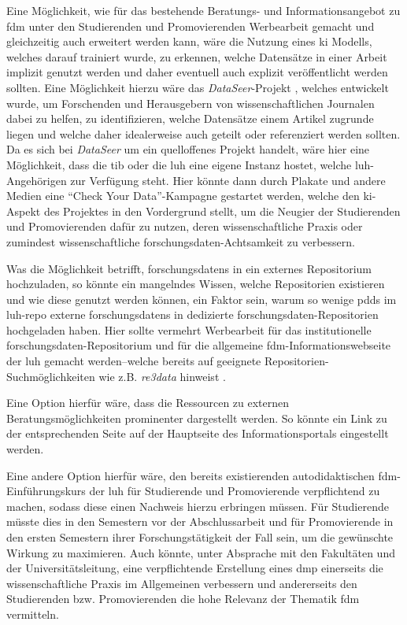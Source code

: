 Eine Möglichkeit, wie für das bestehende Beratungs- und Informationsangebot zu \gls{fdm} unter den Studierenden und Promovierenden Werbearbeit gemacht und gleichzeitig auch erweitert werden kann, wäre die Nutzung eines \gls{ki} Modells, welches darauf trainiert wurde, zu erkennen, welche Datensätze in einer Arbeit implizit genutzt werden und daher eventuell auch explizit veröffentlicht werden sollten.
Eine Möglichkeit hierzu wäre das \textit{DataSeer}-Projekt \autocite{dataseer}, welches entwickelt wurde, um Forschenden und Herausgebern von wissenschaftlichen Journalen dabei zu helfen, zu identifizieren, welche Datensätze einem Artikel zugrunde liegen und welche daher idealerweise auch geteilt oder referenziert werden sollten.
Da es sich bei \textit{DataSeer} um ein quelloffenes Projekt handelt, wäre hier eine Möglichkeit, dass die \gls{tib} oder die \gls{luh} eine eigene Instanz hostet, welche \gls{luh}-Angehörigen zur Verfügung steht.
Hier könnte dann durch Plakate und andere Medien eine \enquote{Check Your Data}-Kampagne gestartet werden, welche den \gls{ki}-Aspekt des Projektes in den Vordergrund stellt, um die Neugier der Studierenden und Promovierenden dafür zu nutzen, deren wissenschaftliche Praxis oder zumindest wissenschaftliche \gls{forschungsdaten}-Achtsamkeit zu verbessern.

Was die Möglichkeit betrifft, \glspl{forschungsdaten} in ein externes Repositorium hochzuladen, so könnte ein mangelndes Wissen, welche Repositorien existieren und wie diese genutzt werden können, ein Faktor sein, warum so wenige \glspl{pdd} im \gls{luh-repo} externe \glspl{forschungsdaten} in dedizierte \gls{forschungsdaten}-Repositorien hochgeladen haben.
Hier sollte vermehrt Werbearbeit für das institutionelle \gls{forschungsdaten}-Repositorium und für die allgemeine \gls{fdm}-Informationswebseite der \gls{luh} gemacht werden--welche bereits auf geeignete Repositorien-Suchmöglichkeiten wie z.B. \textit{re3data} hinweist \autocite{luhfdm-extern}.

Eine Option hierfür wäre, dass die Ressourcen zu externen Beratungsmöglichkeiten prominenter dargestellt werden.
So könnte ein Link zu der entsprechenden Seite auf der Hauptseite des Informationsportals eingestellt werden.

Eine andere Option hierfür wäre, den bereits existierenden autodidaktischen \gls{fdm}-Einführungskurs der \gls{luh} für Studierende und Promovierende verpflichtend zu machen, sodass diese einen Nachweis hierzu erbringen müssen.
Für Studierende müsste dies in den Semestern vor der Abschlussarbeit und für Promovierende in den ersten Semestern ihrer Forschungstätigkeit der Fall sein, um die gewünschte Wirkung zu maximieren.
Auch könnte, unter Absprache mit den Fakultäten und der Universitätsleitung, eine verpflichtende Erstellung eines \gls{dmp} einerseits die wissenschaftliche Praxis im Allgemeinen verbessern und andererseits den Studierenden bzw. Promovierenden die hohe Relevanz der Thematik \gls{fdm} vermitteln.

